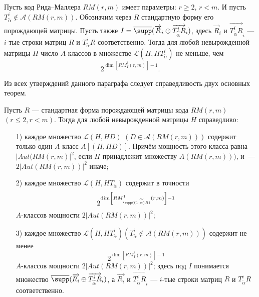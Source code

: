 \begin{proposition}\label{prop27}
Пусть код Рида--Маллера $RM(r,m)$ имеет параметры: $r\geqslant 2$,
$r<m$.  И пусть $T^i_{\widetilde\alpha}\not\in \mathcal
A(RM(r,m)).$ Обозначим через $R$ стандартную форму его порождающей
матрицы. Пусть также
$I=\overline{\supp}(\overrightarrow{R}_i\oplus\overrightarrow{T^i_{\widetilde\alpha}R}_i)$,
здесь $\overrightarrow{R}_i$ и
$\overrightarrow{T^i_{\widetilde\alpha}R}_i$ --- $i$-тые строки
матриц $R$ и $T^i_{\widetilde\alpha}R$ соответственно. Тогда для
любой невырожденной матрицы $H$ число $A$-классов в множестве
$\mathcal L(H,HT^i_{\tilde\alpha})$ не меньше, чем
$$
2^{\dim \left[RM^i_I(r,m)\right]-1}.
$$
\end{proposition}

Из всех утверждений данного параграфа следует справедливость двух
основных теорем.
\begin{theorem}\label{theorem1}
Пусть $R$ --- стандартная форма порождающей матрицы кода $RM(r,m)$
$(r\leqslant 2,r<m)$. Тогда для любой невырожденной матрицы $H$
справедливо:
\begin{itemize}
\item[1)] каждое множество $\mathcal L(H,HD)$ $(D\in \mathcal A(RM(r,m)))$
содержит только один $A$-класс $A[(H,HD)]$. Причём мощность этого класса равна
$|Aut(RM(r,m)|^2$, если $H$ принадлежит множеству $A(RM(r,m)))$, и~---
$2|Aut(RM(r,m))|^2$ иначе;
\item[2)] каждое множество $\mathcal L(H,HT_{\widetilde\alpha})$ содержит
в точности
$$2^{\dim\left[RM^1_{\supp((1,\widetilde\alpha)R)}(r,m)\right]-1}$$
$A$-классов мощности $2|Aut(RM(r,m))|^2$;
\item[3)] каждое множество $\mathcal
L(H,HT^{i}_{\widetilde\alpha})(T^{i}_{\widetilde\alpha}\not\in\mathcal
A(RM(r,m)))$ содержит не менее
$$2^{\dim\left[RM^i_{I}(r,m)\right]-1}$$
$A$-классов мощности $2|Aut(RM(r,m))|^2$; здесь под $I$ понимается
множество $\overline{\supp}(\overrightarrow{R_i}\oplus
\overrightarrow{T^{i}_{\widetilde\alpha}R}_i)$, а
$\overrightarrow{R_i}$ и
$\overrightarrow{T^{i}_{\widetilde\alpha}R}_i$ --- $i$-тые строки
матриц $R$ и $T^{i}_{\widetilde\alpha}R$ соответственно.
\end{itemize}
\end{theorem}

